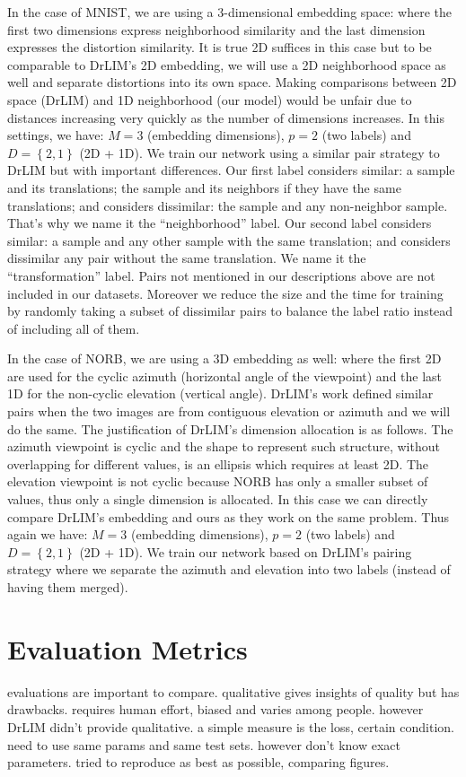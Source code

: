 \documentclass[a4paper,12pt]{report}
\begin{document}
In the case of MNIST, we are using a 3-dimensional embedding space: where the first two dimensions express neighborhood similarity and the last dimension expresses the distortion similarity.
It is true 2D suffices in this case but to be comparable to DrLIM's 2D embedding, we will use a 2D neighborhood space as well and separate distortions into its own space.
Making comparisons between 2D space (DrLIM) and 1D neighborhood (our model) would be unfair due to distances increasing very quickly as the number of dimensions increases.
In this settings, we have: $M=3$ (embedding dimensions), $p = 2$ (two labels) and $D = \left\{ 2, 1 \right\}$ (2D + 1D).
We train our network using a similar pair strategy to DrLIM but with important differences.
Our first label considers similar: a sample and its translations; the sample and its neighbors if they have the same translations; and considers dissimilar: the sample and any non-neighbor sample.
That's why we name it the ``neighborhood'' label.
Our second label considers similar: a sample and any other sample with the same translation; and considers dissimilar any pair without the same translation.
We name it the ``transformation'' label.
Pairs not mentioned in our descriptions above are not included in our datasets.
Moreover we reduce the size and the time for training by randomly taking a subset of dissimilar pairs to balance the label ratio instead of including all of them.

In the case of NORB, we are using a 3D embedding as well: where the first 2D are used for the cyclic azimuth (horizontal angle of the viewpoint) and the last 1D for the non-cyclic elevation (vertical angle).
DrLIM's work defined similar pairs when the two images are from contiguous elevation or azimuth and we will do the same.
The justification of DrLIM's dimension allocation is as follows.
The azimuth viewpoint is cyclic and the shape to represent such structure, without overlapping for different values, is an ellipsis which requires at least 2D.
The elevation viewpoint is not cyclic because NORB has only a smaller subset of values, thus only a single dimension is allocated.
In this case we can directly compare DrLIM's embedding and ours as they work on the same problem.
Thus again we have: $M=3$ (embedding dimensions), $p = 2$ (two labels) and $D = \left\{ 2, 1 \right\}$ (2D + 1D).
We train our network based on DrLIM's pairing strategy where we separate the azimuth and elevation into two labels (instead of having them merged).

\section{Evaluation Metrics}
evaluations are important to compare.
qualitative gives insights of quality but has drawbacks.
requires human effort, biased and varies among people.
however DrLIM didn't provide qualitative.
a simple measure is the loss, certain condition.
need to use same params and same test sets.
however don't know exact parameters.
tried to reproduce as best as possible, comparing figures.
\end{document}
